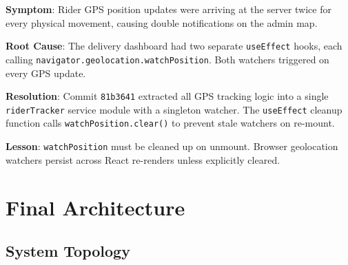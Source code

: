 \documentclass[11pt,a4paper,twoside]{book}
\begin{document}
\textbf{Symptom}: Rider GPS position updates were arriving at the server twice for
every physical movement, causing double notifications on the admin map.

\textbf{Root Cause}: The delivery dashboard had two separate \texttt{useEffect}
hooks, each calling \texttt{navigator.geolocation.watchPosition}.  Both watchers
triggered on every GPS update.

\textbf{Resolution}: Commit \texttt{81b3641} extracted all GPS tracking logic
into a single \texttt{riderTracker} service module with a singleton watcher.
The \texttt{useEffect} cleanup function calls \texttt{watchPosition.clear()} to
prevent stale watchers on re-mount.

\textbf{Lesson}: \texttt{watchPosition} must be cleaned up on unmount.  Browser
geolocation watchers persist across React re-renders unless explicitly cleared.

\chapter{Final Architecture}

\section{System Topology}
\end{document}
